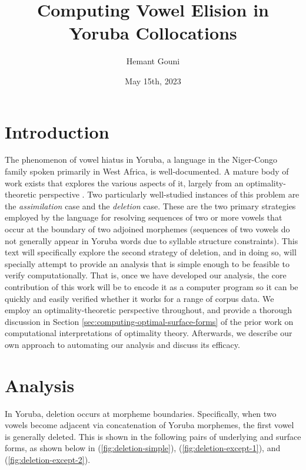 \documentclass[12pt]{article}
\title{Computing Vowel Elision in Yoruba Collocations}
\author{Hemant Gouni}
\date{May 15th, 2023}
\newcommand{\pref}[1]{(\ref{#1})}
\begin{document}
\maketitle

\section{Introduction}


The phenomenon of vowel hiatus in Yoruba, a language in the Niger-Congo family
spoken primarily in West Africa, is well-documented. A mature body of work
exists that explores the various aspects of it, largely from an
optimality-theoretic perspective \cite{ola2002yoruba, seidl2000yoruba,
pulleyblank1988vowel}. Two particularly well-studied instances of this problem
are the \textit{assimilation} case and the \textit{deletion} case. These are the
two primary strategies employed by the language for resolving sequences of two
or more vowels that occur at the boundary of two adjoined morphemes
(sequences of two vowels do not generally appear in Yoruba words due to
syllable structure constraints). This text will specifically explore the
second strategy of deletion, and in doing so, will specially attempt to provide
an analysis that is simple enough to be feasible to verify computationally. That
is, once we have developed our analysis, the core contribution of this work
will be to encode it as a computer program so it can be quickly and easily
verified whether it works for a range of corpus data. We employ an
optimality-theoretic perspective throughout, and provide a thorough discussion
in Section \ref{sec:computing-optimal-surface-forms} of the prior work on
computational interpretations of optimality theory. Afterwards, we describe
our own approach to automating our analysis and discuss its efficacy.

\section{Analysis}

In Yoruba, deletion occurs at morpheme boundaries. Specifically, when two
vowels become adjacent via concatenation of Yoruba morphemes, the first vowel
is generally deleted. This is shown in the following pairs of underlying and
surface forms, as shown below in \pref{fig:deletion-simple},
\pref{fig:deletion-except-1}, and \pref{fig:deletion-except-2}.
\end{document}

